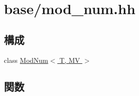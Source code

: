 \hypertarget{mod__num_8hh}{
\section{base/mod\_\-num.hh}
\label{mod__num_8hh}
}
\subsection*{構成}
\begin{DoxyCompactItemize}
\item 
class \hyperlink{classModNum}{ModNum$<$ T, MV $>$}
\end{DoxyCompactItemize}
\subsection*{関数}
